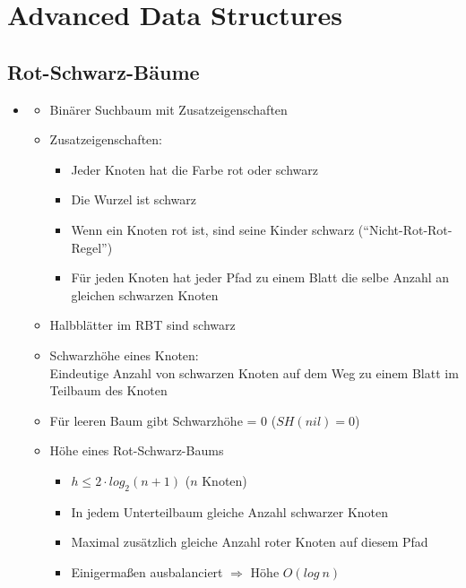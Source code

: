 \documentclass[
    12pt,
    a4paper,
    ngerman,
    color=3b,%
    marginpar=false,
    colorback=false,
    leqno,
]{tudaexercise}
\begin{document}
\section{Advanced Data Structures}\label{Advanced Data Structures}
\subsection{Rot-Schwarz-Bäume}\label{Rot-Schwarz-Baeume}
    \begin{itemize}
        \item {}
            \begin{itemize}
                \item Binärer Suchbaum mit Zusatzeigenschaften
                \item Zusatzeigenschaften:
                    \begin{itemize}
                        \item Jeder Knoten hat die Farbe rot oder schwarz
                        \item Die Wurzel ist schwarz
                        \item Wenn ein Knoten rot ist, sind seine Kinder schwarz ("`Nicht-Rot-Rot-Regel"')
                        \item Für jeden Knoten hat jeder Pfad zu einem Blatt die selbe Anzahl an gleichen schwarzen Knoten
                    \end{itemize}
                \item Halbblätter im RBT sind schwarz
                \item Schwarzhöhe eines Knoten: \\
                        Eindeutige Anzahl von schwarzen Knoten auf dem Weg zu einem Blatt im Teilbaum des Knoten
                \item Für leeren Baum gibt Schwarzhöhe = 0 ($SH(nil)=0$)
                \item Höhe eines Rot-Schwarz-Baums
                    \begin{itemize}
                        \item $h \leq 2 \cdot log_2(n+1)$  ($n$ Knoten)
                        \item In jedem Unterteilbaum gleiche Anzahl schwarzer Knoten
                        \item Maximal zusätzlich gleiche Anzahl roter Knoten auf diesem Pfad
                        \item Einigermaßen ausbalanciert $\Rightarrow$ Höhe $O(log~n)$

\end{itemize}
\end{itemize}
\end{itemize}
\end{document}

